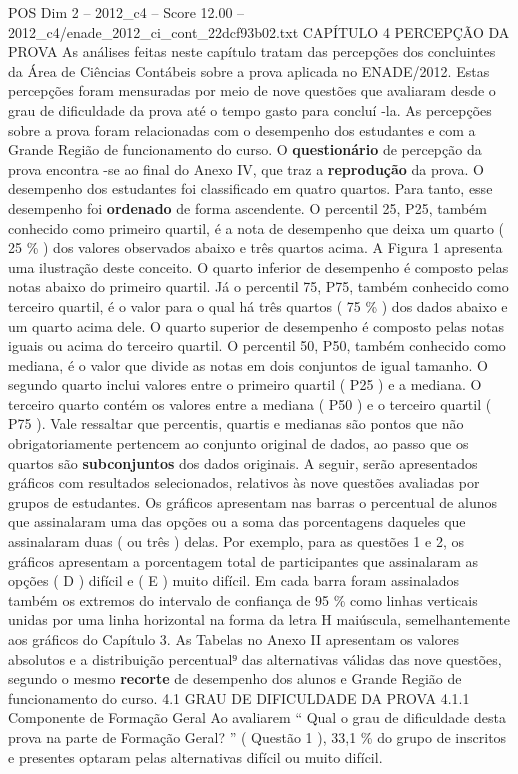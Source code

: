 \begin{textsample}{POS Dim 2 – 2012\_c4 – Score 12.00 – 2012\_c4/enade\_2012\_ci\_cont\_22dcf93b02.txt}  \label{ex:f2_pos_101}
CAPÍTULO 4 PERCEPÇÃO DA PROVA As análises feitas neste capítulo tratam das percepções dos concluintes da Área de Ciências Contábeis sobre a prova aplicada no ENADE/2012.
Estas percepções foram mensuradas por meio de nove questões que avaliaram desde o grau de dificuldade da prova até o tempo gasto para concluí -la.
As percepções sobre a prova foram relacionadas com o desempenho dos estudantes e com a Grande Região de funcionamento do curso.
O \textbf{questionário} de percepção da prova encontra -se ao final do Anexo IV, que traz a \textbf{reprodução} da prova.
O desempenho dos estudantes foi classificado em quatro quartos.
Para tanto, esse desempenho foi \textbf{ordenado} de forma ascendente.
O percentil 25, P25, também conhecido como primeiro quartil, é a nota de desempenho que deixa um quarto ( 25 \% ) dos valores observados abaixo e três quartos acima.
A Figura 1 apresenta uma ilustração deste conceito.
O quarto inferior de desempenho é composto pelas notas abaixo do primeiro quartil.
Já o percentil 75, P75, também conhecido como terceiro quartil, é o valor para o qual há três quartos ( 75 \% ) dos dados abaixo e um quarto acima dele.
O quarto superior de desempenho é composto pelas notas iguais ou acima do terceiro quartil.
O percentil 50, P50, também conhecido como mediana, é o valor que divide as notas em dois conjuntos de igual tamanho.
O segundo quarto inclui valores entre o primeiro quartil ( P25 ) e a mediana.
O terceiro quarto contém os valores entre a mediana ( P50 ) e o terceiro quartil ( P75 ).
Vale ressaltar que percentis, quartis e medianas são pontos que não obrigatoriamente pertencem ao conjunto original de dados, ao passo que os quartos são \textbf{subconjuntos} dos dados originais.
A seguir, serão apresentados gráficos com resultados selecionados, relativos às nove questões avaliadas por grupos de estudantes.
Os gráficos apresentam nas barras o percentual de alunos que assinalaram uma das opções ou a soma das porcentagens daqueles que assinalaram duas ( ou três ) delas.
Por exemplo, para as questões 1 e 2, os gráficos apresentam a porcentagem total de participantes que assinalaram as opções ( D ) difícil e ( E ) muito difícil.
Em cada barra foram assinalados também os extremos do intervalo de confiança de 95 \% como linhas verticais unidas por uma linha horizontal na forma da letra H maiúscula, semelhantemente aos gráficos do Capítulo 3.
As Tabelas no Anexo II apresentam os valores absolutos e a distribuição percentual⁹ das alternativas válidas das nove questões, segundo o mesmo \textbf{recorte} de desempenho dos alunos e Grande Região de funcionamento do curso. 4.1 GRAU DE DIFICULDADE DA PROVA 4.1.1 Componente de Formação Geral Ao avaliarem “ Qual o grau de dificuldade desta prova na parte de Formação Geral? ” ( Questão 1 ), 33,1 \% do grupo de inscritos e presentes optaram pelas alternativas difícil ou muito difícil.

\end{textsample}
